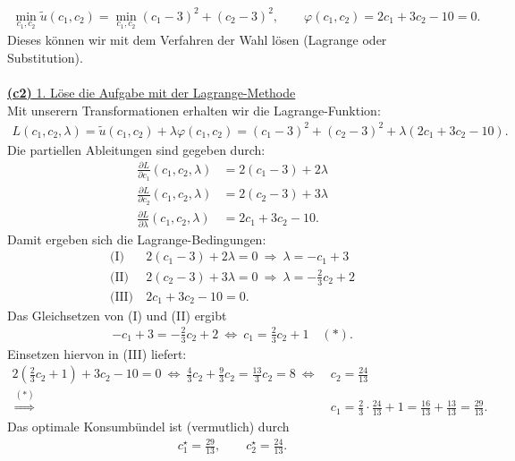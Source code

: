 \begin{align*}
	\min \limits_{c_1,c_2}
	\tilde{u}(c_1,c_2)
	=
	\min \limits_{c_1,c_2} (c_1 -3)^2 + (c_2-3)^2
	, \qquad \varphi(c_1,c_2) = 2 c_1 + 3c_2 - 10= 0.
\end{align*}
Dieses können wir mit dem Verfahren der Wahl lösen (Lagrange oder Substitution).\\
\\
\underline{\textbf{(c2)} 1. Löse die Aufgabe mit der Lagrange-Methode}\\
Mit unserern Transformationen erhalten wir die Lagrange-Funktion:
\begin{align*}
	L(c_1,c_2,\lambda)
	=
	\tilde{u}(c_1,c_2) + \lambda \varphi(c_1,c_2)
	=
	(c_1-3)^2 + (c_2-3)^2 + \lambda ( 2c_1 + 3 c_2 -10).
\end{align*}
Die partiellen Ableitungen sind gegeben durch:
\begin{align*}
	\frac{\partial L}{\partial c_1}(c_1, c_2 , \lambda)
	&= 2(c_1 -3) + 2 \lambda\\
	\frac{\partial L}{\partial c_2}(c_1, c_2 , \lambda)
	&= 2(c_2 -3) + 3 \lambda \\
	\frac{\partial L}{\partial \lambda}(c_1, c_2 , \lambda)
	&= 2 c_1 + 3 c_2 - 10 .
\end{align*}
Damit ergeben sich die Lagrange-Bedingungen:
\begin{align*}
	\text{(I)} &\ 2(c_1 -3) + 2 \lambda = 0 
	\ \Rightarrow \
	\lambda = - c_1 + 3	\\
	\text{(II)} &\ 2(c_2 -3) + 3 \lambda  = 0
	\ \Rightarrow \
	\lambda = - \frac{2}{3} c_2 + 2
	\\
	\text{(III)} &\ 2 c_1 + 3 c_2 - 10 = 0.
\end{align*}
Das Gleichsetzen von (I) und (II) ergibt
\begin{align*}
	-c_1 + 3 = - \frac{2}{3} c_2 +2
	\ \Leftrightarrow \
	c_1 = \frac{2}{3} c_2 +1 \quad (\ast) .
\end{align*}
Einsetzen hiervon in (III) liefert:
\begin{align*}
	2 \left(\frac{2}{3}c_2 + 1\right) + 3 c_2 - 10 = 0
	\ \Leftrightarrow \
	\frac{4}{3} c_2 + \frac{9 }{3} c_2 = \frac{13}{3} c_2 = 8 
	\ \Leftrightarrow \
	&c_2 = \frac{24}{13}\\ 
	\
	\overset{(\ast)}{\Rightarrow}
	&c_1 = \frac{2}{3} \cdot\frac{24}{13} + 1
	= \frac{16}{13} + \frac{13}{13} = \frac{29}{13}.
\end{align*}
Das optimale Konsumbündel ist (vermutlich) durch
\begin{align*}
	c_1^\star = \frac{29}{13}, \qquad 
	c_2^\star = \frac{24}{13}.
\end{align*}
